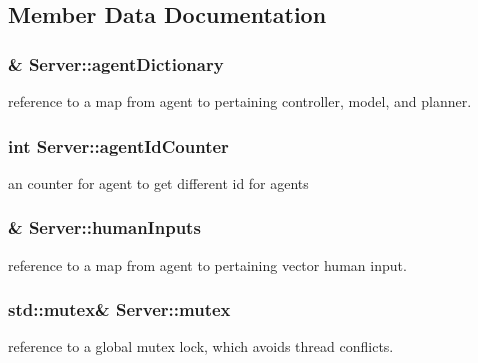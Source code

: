 \subsection{Member Data Documentation}
\subsubsection[{\texorpdfstring{agent\+Dictionary}{agentDictionary}}]{\& Server\+::agent\+Dictionary\hspace{0.3cm}{\ttfamily [private]}}\hypertarget{classServer_ae45bd58f8585e0c47e5140a055cad09c}{}\label{classServer_ae45bd58f8585e0c47e5140a055cad09c}
reference to a map from agent to pertaining controller, model, and planner. 
\subsubsection[{\texorpdfstring{agent\+Id\+Counter}{agentIdCounter}}]{\setlength{\rightskip}{0pt plus 5cm}int Server\+::agent\+Id\+Counter\hspace{0.3cm}{\ttfamily [private]}}\hypertarget{classServer_ac179860cef2427f743ff1daefa881eb2}{}\label{classServer_ac179860cef2427f743ff1daefa881eb2}
an counter for agent to get different id for agents 
\subsubsection[{\texorpdfstring{human\+Inputs}{humanInputs}}]{\& Server\+::human\+Inputs\hspace{0.3cm}{\ttfamily [private]}}\hypertarget{classServer_a3d62b0bc3c31161790b118717a4c4718}{}\label{classServer_a3d62b0bc3c31161790b118717a4c4718}
reference to a map from agent to pertaining vector human input. 
\subsubsection[{\texorpdfstring{mutex}{mutex}}]{\setlength{\rightskip}{0pt plus 5cm}std\+::mutex\& Server\+::mutex\hspace{0.3cm}{\ttfamily [private]}}\hypertarget{classServer_a9a508fe15f3a6e3b2e3750b0ff2d5798}{}\label{classServer_a9a508fe15f3a6e3b2e3750b0ff2d5798}
reference to a global mutex lock, which avoids thread conflicts. 
